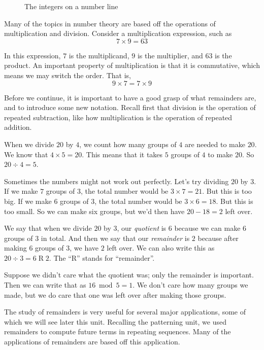\documentclass[a4paper,10pt]{report}
\begin{document}
\begin{figure}

 \caption{The integers on a number line}
 \label{nt-int:inumberline}
\end{figure}

Many of the topics in number theory are based off the operations of
multiplication and division. Consider a multiplication expression, such as \[ 7
\times 9 = 63 \]

In this expression, \(7\) is the \gls{multiplicand}, \(9\) is the
\gls{multiplier}, and \(63\) is the \gls{product}. An important property of
multiplication is that it is commutative, which means we may switch the order.
That is, \[ 9 \times 7 = 7 \times 9 \]

Before we continue, it is important to have a good grasp of what remainders
are, and to introduce some new notation. Recall first that division is the
operation of repeated subtraction, like how multiplication is the operation of
repeated addition.

When we divide \(20\) by \(4\), we count how many groups of \(4\) are needed to
make \(20\). We know that \(4 \times 5 = 20\). This means that it takes \(5\)
groups of \(4\) to make \(20\). So \(20 \div 4 = 5\).

Sometimes the numbers might not work out perfectly. Let's try dividing \(20\)
by \(3\). If we make \(7\) groups of \(3\), the total number would be \(3
\times 7 = 21\). But this is too big. If we make \(6\) groups of \(3\), the
total number would be \(3 \times 6 = 18\). But this is too small. So we can
make six groups, but we'd then have \(20 - 18 = 2\) left over.

We say that when we divide \(20\) by \(3\), our \emph{quotient} is \(6\)
because we can make \(6\) groups of \(3\) in total. And then we say that our
\emph{remainder} is \(2\) because after making \(6\) groups of \(3\), we have
\(2\) left over. We can also write this as \(20 \div 3 = 6 \operatorname{R}
2\). The ``R'' stands for ``remainder''.

Suppose we didn't care what the quotient was; only the remainder is important.
Then we can write that as \(16 \bmod 5 = 1\). We don't care how many groups we
made, but we do care that one was left over after making those groups.

The study of remainders is very useful for several major applications, some of
which we will see later this unit. Recalling the patterning unit, we used
remainders to compute future terms in repeating sequences. Many of the
applications of remainders are based off this application.
\end{document}
